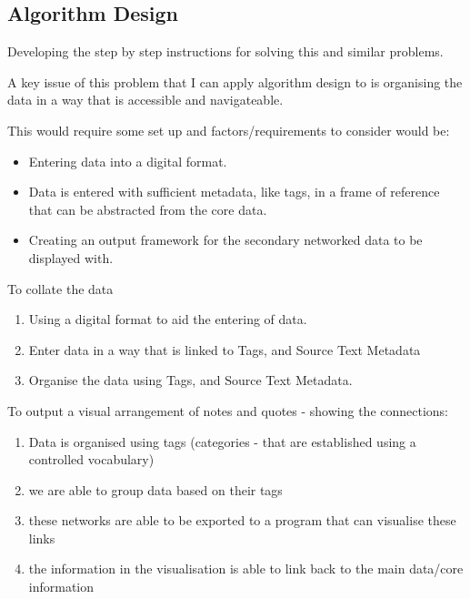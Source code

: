 \documentclass{article}
\begin{document}
\subsection{Algorithm Design}
Developing the step by step instructions for solving this and similar problems.

A key issue of this problem that I can apply algorithm design to is organising the data in a way that is accessible and navigateable.

This would require some set up and factors/requirements to consider would be:
\begin{itemize}
    \item Entering data into a digital format.
    \item Data is entered with sufficient metadata, like tags, in a frame of reference that can be abstracted from the core data.
    \item Creating an output framework for the secondary networked data to be displayed with.
\end{itemize}

To collate the data
\begin{enumerate}
    \item Using a digital format to aid the entering of data. 
    \item Enter data in a way that is linked to Tags, and Source Text Metadata
    \item Organise the data using Tags, and Source Text Metadata.
\end{enumerate}

To output a visual arrangement of notes and quotes - showing the connections:
\begin{enumerate}
    \item Data is organised using tags (categories - that are established using a controlled vocabulary)
    \item we are able to group data based on their tags
    \item these networks are able to be exported to a program that can visualise these links
    \item the information in the visualisation is able to link back to the main data/core information
\end{enumerate}
\end{document}
